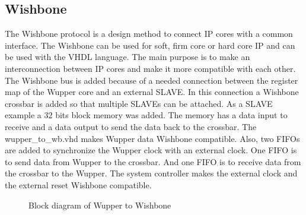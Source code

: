 \subsection{Wishbone}
\begin{flushleft}
The Wishbone protocol is a design method to connect IP cores with a common interface.
The Wishbone can be used for soft, firm core or hard core IP and can be used with the VHDL language. The main purpose is to make an interconnection between IP cores and make it more compatible with each other. \newline
The Wishbone bus is added because of a needed connection between the register map of the Wupper core and an external SLAVE. In this connection a Wishbone crossbar is added so that multiple SLAVEs can be attached. As a SLAVE example a 32 bits block memory was added. The memory has a data input to receive and a data output to send the data back to the crossbar. \newline
The wupper\_to\_wb.vhd makes Wupper data Wishbone compatible. Also, two FIFOs are added to synchronize the Wupper clock  with an external clock. One FIFO is to send data from Wupper to the crossbar. And one FIFO is to receive  data from the crossbar to the Wupper. \newline
The system controller makes the external clock and the external reset Wishbone compatible.
\begin{figure}[H]
	\centering
	
	\caption{Block diagram of Wupper to Wishbone}
	\label{fig:wupper_to_wishbone}
\end{figure}
\end{flushleft}

\newpage
